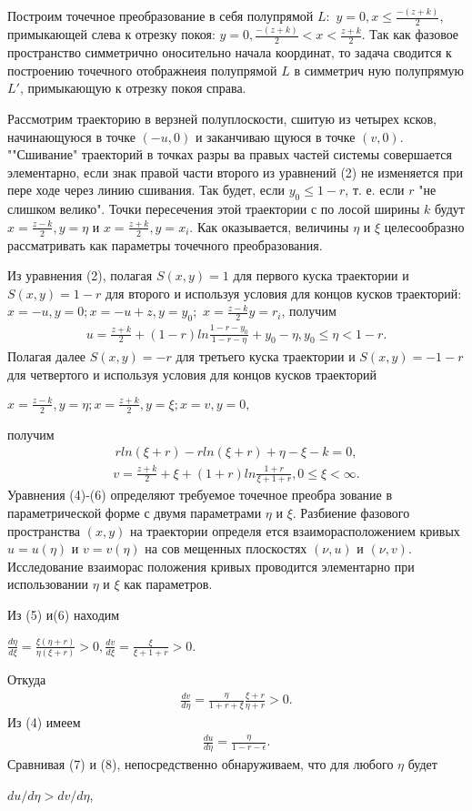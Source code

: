 \documentclass{article}
\begin{document}
Построим точечное преобразование в себя полупрямой $L:$
$y=0, x\leq\frac{-(z+k)}{2}$, примыкающей слева к отрезку покоя: $y
=0, \frac{-(z+k)}{2}<x<\frac{z+k}{2}$. Так как фазовое пространство
симметрично оносительно начала координат, то задача сводится
к построению точечного отображнеия полупрямой $L$ в симметрич
ную полупрямую $L'$, примыкающую к отрезку покоя справа.%

Рассмотрим траекторию в верзней полуплоскости, сшитую из
четырех ксков, начинающуюся в точке $(-u, 0)$ и заканчиваю
щуюся в точке $(v,0)$. ""Сшивание" траекторий в точках разры
ва правых частей системы совершается элементарно, если знак
правой части второго из уравнений (2) не изменяется при пере
ходе через линию сшивания. Так будет, если $y_{0}\leq1-r$, т. е. если
$r$ "не слишком велико". Точки пересечения этой траектории с по
лосой ширины $k$ будут $x=\frac{z-k}{2}, y=\eta$ и $x=\frac{z+k}{2}, y=x_{i}$. Как
оказывается, величины $\eta$ и $\xi$ целесообразно рассматривать как
параметры точечного преобразования.%

Из уравнения (2), полагая $S(x, y)=1$ для первого куска
траектории и $S(x, y)=1-r$ для второго и используя условия
для концов кусков траекторий: $x=-u, y=0; x=-u+z, y=y_{0};$
$x=\frac{z-k}{2} y=r_{i}$, получим
\begin{gather}
u=\frac{z+k}{2} + (1-r)ln\frac{1-r-y_{0}}{1-r-\eta}+y_{0}-\eta, y_{0}\leq\eta<1-r.
\end{gather}
Полагая далее $S(x,y)=-r$ для третьего куска траектории и
$S(x,y)=-1-r$ для четвертого и используя условия для концов
кусков траекторий
\begin{center}
$x=\frac{z-k}{2}, y=\eta; x=\frac{z+k}{2}, y=\xi; x=v, y=0,$
\end{center}
получим
\begin{gather}
r ln(\xi + r) - r ln(\xi+r)+\eta-\xi-k=0,
\end{gather}
\begin{gather}
v=\frac{z+k}{2}+\xi+(1+r)ln\frac{1+r}{\xi+1+r}, 0\leq\xi<\infty. 
\end{gather}
Уравнения (4)-(6) определяют требуемое точечное преобра
зование в параметрической форме с двумя параметрами $\eta$ и $\xi$.
Разбиение фазового пространства $(x,y)$ на траектории определя
ется взаиморасположением кривых $u=u(\eta)$ и $v=v(\eta)$ на сов
мещенных плоскостях $(\nu, u)$ и $(\nu, v)$. Исследование взаиморас
положения кривых проводится элементарно при использовании
$\eta$ и $\xi$ как параметров.%

Из (5) и(6) находим
\begin{center}
$\frac{d\eta}{d\xi}=\frac{\xi(\eta+r)}{\eta(\xi+r)}> 0, \frac{dv}{d\xi}=\frac{\xi}{\xi+1+r}>0.$
\end{center}
Откуда
\begin{gather}
\frac{dv}{d\eta}=\frac{\eta}{1+r+\xi}\frac{\xi+r}{\eta+r}>0.
\end{gather}
Из (4) имеем\\%
\begin{gather}
\frac{du}{d\eta}=\frac{\eta}{1-r-\epsilon}.
\end{gather}
Сравнивая (7) и (8), непосредственно обнаруживаем, что для
любого $\eta$ будет
\begin{center}
$du/d\eta>dv/d\eta$,
\end{center}
\end{document}
